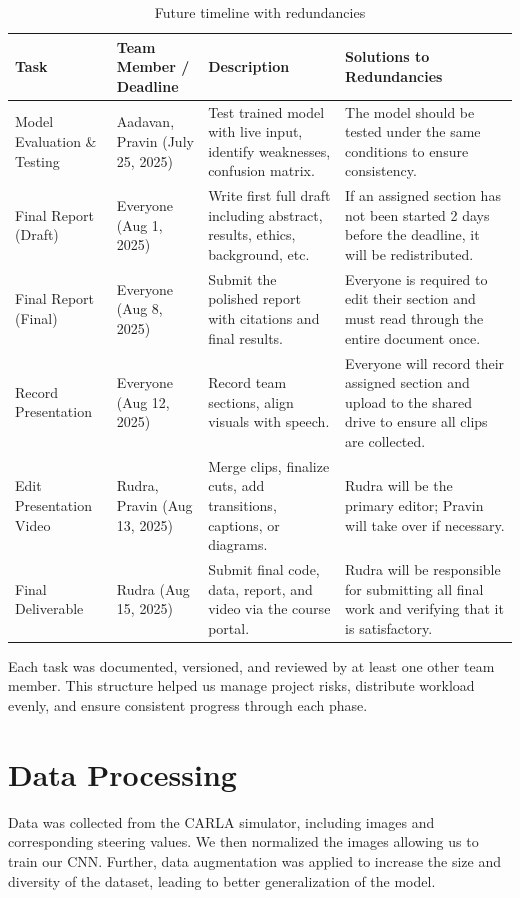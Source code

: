 \documentclass{article} %
\begin{document}
\begin{table}[H]
\centering
\caption{Future timeline with redundancies}
\begin{tabular}{|p{2.5cm}|p{4cm}|p{4cm}|p{4cm}|}
\hline
\textbf{Task} & \textbf{Team Member / Deadline} & \textbf{Description} & \textbf{Solutions to Redundancies} \\
\hline
Model Evaluation \& Testing & Aadavan, Pravin (July 25, 2025) & Test trained model with live input, identify weaknesses, confusion matrix. & The model should be tested under the same conditions to ensure consistency. \\
\hline
Final Report (Draft) & Everyone (Aug 1, 2025) & Write first full draft including abstract, results, ethics, background, etc. & If an assigned section has not been started 2 days before the deadline, it will be redistributed. \\
\hline
Final Report (Final) & Everyone (Aug 8, 2025) & Submit the polished report with citations and final results. & Everyone is required to edit their section and must read through the entire document once. \\
\hline
Record Presentation & Everyone (Aug 12, 2025) & Record team sections, align visuals with speech. & Everyone will record their assigned section and upload to the shared drive to ensure all clips are collected. \\
\hline
Edit Presentation Video & Rudra, Pravin (Aug 13, 2025) & Merge clips, finalize cuts, add transitions, captions, or diagrams. & Rudra will be the primary editor; Pravin will take over if necessary. \\
\hline
Final Deliverable & Rudra (Aug 15, 2025) & Submit final code, data, report, and video via the course portal. & Rudra will be responsible for submitting all final work and verifying that it is satisfactory. \\
\hline
\end{tabular}
\label{tab:futureTimeline}
\end{table}

Each task was documented, versioned, and reviewed by at least one other team member. This structure helped us manage project risks, distribute workload evenly, and ensure consistent progress through each phase.

\section{Data Processing}

Data was collected from the CARLA simulator, including images and corresponding steering values. We then normalized the images allowing us to train our CNN.
Further, data augmentation was applied to increase the size and diversity of the dataset, leading to better generalization of the model.
\end{document}
